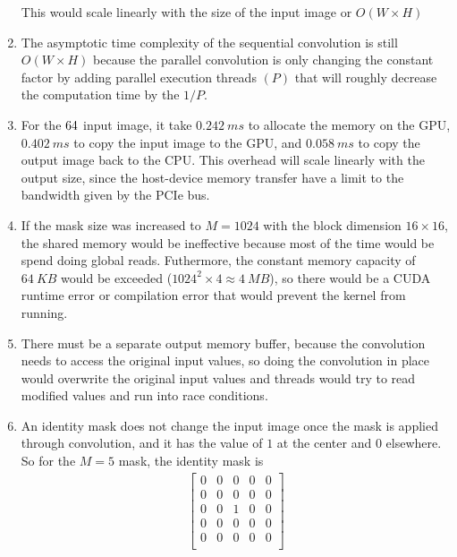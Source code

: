 \documentclass[../main.tex]{subfiles}
\begin{document}
\begin{enumerate}
    This would scale linearly with the size of the input image or $O(W \times H)$

    \item The asymptotic time complexity of the sequential convolution is still $O(W \times H)$
    because the parallel convolution is only changing the constant factor by adding parallel
    execution threads $(P)$ that will roughly decrease the computation time by the $1/P$.

    \item For the $64 \time 64$ input image, it take $\qty{0.242}{ms}$ to allocate the memory
    on the GPU, $\qty{0.402}{ms}$ to copy the input image to the GPU, and $\qty{0.058}{ms}$ to
    copy the output image back to the CPU. This overhead will scale linearly with the output size,
    since the host-device memory transfer have a limit to the bandwidth given by the PCIe bus.

    \item If the mask size was increased to $M = 1024$ with the block dimension $16 \times 16$,
    the shared memory would be ineffective because most of the time would be spend doing global
    reads. Futhermore, the constant memory capacity of $\qty{64}{KB}$ 
    would be exceeded ($1024^2 \times 4 \approx \qty{4}{MB}$), so there would be a CUDA runtime
    error or compilation error that would prevent the kernel from running.

    \item There must be a separate output memory buffer, because the convolution
    needs to access the original input values, so doing the convolution in place
    would overwrite the original input values and threads would try to read modified
    values and run into race conditions.

    \item An identity mask does not change the input image once the mask is applied through 
    convolution, and it has the value of $1$ at the center and $0$ elsewhere. So for the $M = 5$
    mask, the identity mask is
    \begin{align*}
        \begin{bmatrix}
            0 & 0 & 0 & 0 & 0 \\
            0 & 0 & 0 & 0 & 0 \\
            0 & 0 & 1 & 0 & 0 \\
            0 & 0 & 0 & 0 & 0 \\
            0 & 0 & 0 & 0 & 0 \\
        \end{bmatrix}
    \end{align*}

\end{enumerate}
\end{document}
